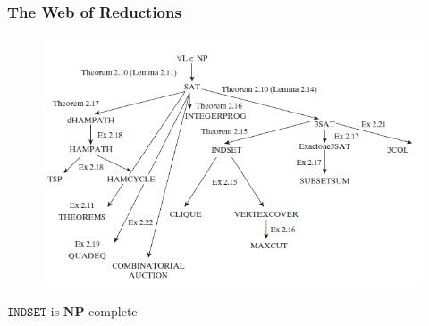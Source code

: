 \documentclass[11pt]{article}
\def \NP {\textbf{NP}}
\def \NP {\textbf{NP}}
\def \INDSET {\texttt{INDSET}}
\begin{document}
\subsubsection{The Web of Reductions}
\label{sec:org8cb936f}
\begin{figure}[htbp]
\centering
\includegraphics[width=.9\linewidth]{../images/ComputationalComplexity/6.png}
\end{figure}

\begin{theorem}[]
\(\INDSET\) is \(\NP\)-complete
\end{theorem}
\end{document}
